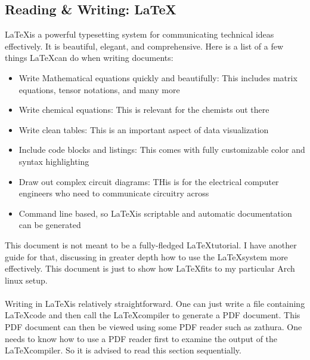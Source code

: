 \documentclass[a4paper, 12pt]{report}
\begin{document}
\begin{center}
\section{Reading \& Writing: \LaTeX}

\LaTeX is a powerful typesetting system for communicating technical ideas effectively. It is beautiful, elegant, and comprehensive. Here is a list of a few things \LaTeX can do when writing documents:
\begin{itemize}
\item Write Mathematical equations quickly and beautifully: This includes matrix equations, tensor notations, and many more
\item Write chemical equations: This is relevant for the chemists out there
\item Write clean tables: This is an important aspect of data visualization
\item Include code blocks and listings: This comes with fully customizable color and syntax highlighting
\item Draw out complex circuit diagrams: THis is for the electrical computer engineers who need to communicate circuitry across
\item Command line based, so \LaTeX is scriptable and automatic documentation can be generated 
\end{itemize}
This document is not meant to be a fully-fledged \LaTeX tutorial. I have another guide for that, discussing in greater depth how to use the \LaTeX system more effectively. This document is just to show how \LaTeX fits to my particular Arch linux setup.
\\~\\Writing in \LaTeX is relatively straightforward. One can just write a file containing \LaTeX code and then call the \LaTeX compiler to generate a PDF document. This PDF document can then be viewed using some PDF reader such as zathura. One needs to know how to use a PDF reader first to examine the output of the \LaTeX compiler. So it is advised to read this section sequentially.



\end{center}
\end{document}
